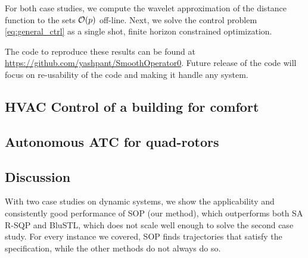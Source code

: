 For both case studies, we compute the wavelet approximation of the distance function to the sets $\mathcal{O}(p)$ off-line. 
Next, we solve the control problem \eqref{eq:general_ctrl} as a single shot, finite horizon constrained optimization. 

The code to reproduce these results can be found at \protect\url{https://github.com/yashpant/SmoothOperator0}. Future release of the code will focus on re-usability of the code and making it handle any system.


\subsection{HVAC Control of a building for comfort}


\subsection{Autonomous ATC for quad-rotors}
\label{sec:ATCquad}



\subsection{Discussion}
With two case studies on dynamic systems, we show the applicability and consistently good performance of SOP (our method), which outperforms both SA R-SQP and BluSTL, which does not scale well enough to solve the second case study. For every instance we covered, SOP finds trajectories that satisfy the specification, while the other methods do not always do so.


